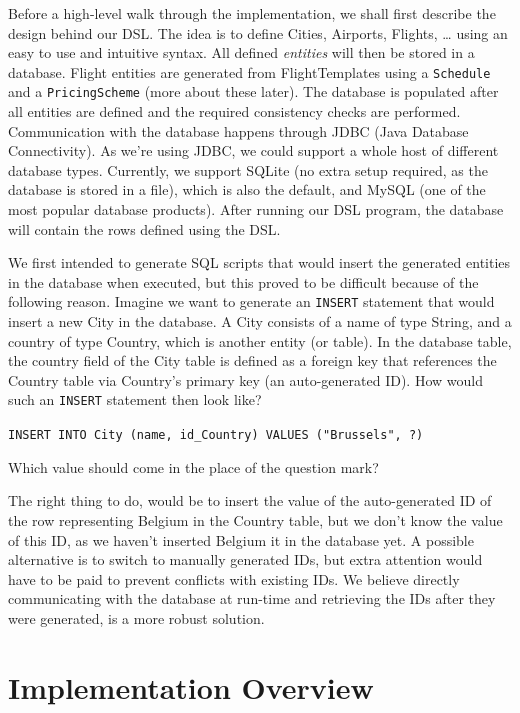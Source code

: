 \documentclass[a4paper]{article}
\newcommand{\cc}[1]{\texttt{#1}}
\begin{document}

Before a high-level walk through the implementation, we shall first describe the design behind our DSL.
The idea is to define Cities, Airports, Flights, \ldots{} using an easy to use and intuitive syntax.
All defined \emph{entities} will then be stored in a database.
Flight entities are generated from FlightTemplates using a \cc{Schedule} and a \cc{Pricing\-Scheme} (more about these later).
The database is populated after all entities are defined and the required consistency checks are performed.
Communication with the database happens through \textsc{JDBC} (Java Database Connectivity).
As we're using \textsc{JDBC}, we could support a whole host of different database types.
Currently, we support SQLite (no extra setup required, as the database is stored in a file), which is also the default, and MySQL (one of the most popular database products).
After running our DSL program, the database will contain the rows defined using the DSL.\@

We first intended to generate SQL scripts that would insert the generated entities in the database when executed, but this proved to be difficult because of the following reason.
Imagine we want to generate an \cc{INSERT} statement that would insert a new City in the database.
A City consists of a name of type String, and a country of type Country, which is another entity (or table).
In the database table, the country field of the City table is defined as a foreign key that references the Country table via Country's primary key (an auto-generated ID).
How would such an \cc{INSERT} statement then look like?

\cc{INSERT INTO City (name, id\_Country) VALUES ("Brussels", ?)}

Which value should come in the place of the question mark?

The right thing to do, would be to insert the value of the auto-generated ID of the row representing Belgium in the Country table, but we don't know the value of this ID, as we haven't inserted Belgium it in the database yet.
A possible alternative is to switch to manually generated IDs, but extra attention would have to be paid to prevent conflicts with existing IDs.
We believe directly communicating with the database at run-time and retrieving the IDs after they were generated, is a more robust solution.


\section{Implementation Overview}
\label{sec:implementation-overview}
\end{document}

